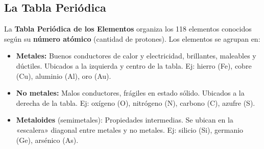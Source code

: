 \documentclass[12pt, a4paper]{article}
\begin{document}
\newpage

\subsection{La Tabla Periódica}

La \textbf{Tabla Periódica de los Elementos} organiza los 118 elementos conocidos según su \textbf{número atómico} (cantidad de protones). Los elementos se agrupan en:

\begin{cuadrosolucion}
\begin{itemize}[leftmargin=*]
  \item \textbf{Metales:} Buenos conductores de calor y electricidad, brillantes, maleables y dúctiles. Ubicados a la izquierda y centro de la tabla. Ej: hierro (Fe), cobre (Cu), aluminio (Al), oro (Au).
  
  \item \textbf{No metales:} Malos conductores, frágiles en estado sólido. Ubicados a la derecha de la tabla. Ej: oxígeno (O), nitrógeno (N), carbono (C), azufre (S).
  
  \item \textbf{Metaloides} (semimetales): Propiedades intermedias. Se ubican en la «escalera» diagonal entre metales y no metales. Ej: silicio (Si), germanio (Ge), arsénico (As).
\end{itemize}
\end{cuadrosolucion}
\end{document}
